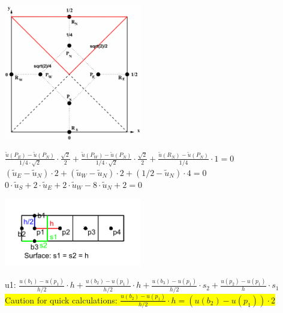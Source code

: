 \begin{minipage}{6cm}
	\includegraphics[width=6cm]{Content/02_numerics/FVM2.png}
\end{minipage}
\hfill
\begin{minipage}{12cm}

 $\frac{\tilde{u}(P_E)-\tilde{u}(P_N)}{1/4\cdot\sqrt{2}}\cdot\frac{\sqrt{2}}{2}+\frac{\tilde{u}(P_W)-\tilde{u}(P_N)}{1/4\cdot\sqrt{2}}\cdot\frac{\sqrt{2}}{2}+\frac{\tilde{u}(R_N)-\tilde{u}(P_N)}{1/4}\cdot 1=0$\\

 $(\tilde{u}_E-\tilde{u}_N)\cdot 2 + (\tilde{u}_W-\tilde{u}_N)\cdot 2 + (1/2-\tilde{u}_N)\cdot 4=0$\\

 $0\cdot\tilde{u}_S+2\cdot\tilde{u}_E+2\cdot\tilde{u}_W-8\cdot\tilde{u}_N+2=0$

\end{minipage}

\begin{minipage}{6cm}
\includegraphics[width=6cm]{Content/02_numerics/fvm_beispiel.pdf}
\end{minipage}
\hfill
\begin{minipage}{12cm}

u1: $\frac{u(b_1) - u(p_1)}{h/2} \cdot h + \frac{u(b_2) - u(p_1)}{h/2} \cdot h +
\frac{u(b_3) - u(p_1)}{h/2} \cdot s_2 + \frac{u(p_2) - u(p_1)}{h} \cdot s_1 $\\
\colorbox{yellow}{Caution for quick calculations: $\frac{u(b_2) - u(p_1)}{h/2}
\cdot h = (u(b_2) - u(p_1)) \cdot 2$}

\end{minipage}


